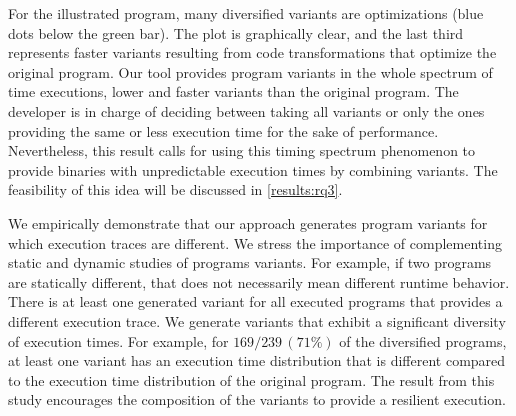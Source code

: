 For the illustrated program, many diversified variants are optimizations (blue dots below the green bar). The plot is graphically clear, and the last third represents faster variants resulting from code transformations that optimize the original program.
Our tool provides program variants in the whole spectrum of time executions, lower and faster variants than the original program. The developer is in charge of deciding between taking all variants or only the ones providing the same or less execution time for the sake of performance. Nevertheless, this result calls for using this timing spectrum phenomenon to provide binaries with unpredictable execution times by combining variants. The feasibility of this idea will be discussed in \autoref{results:rq3}.


\begin{tcolorbox}[title=Answer to RQ2.,boxrule=2pt,arc=.3em,boxsep=1.5mm]
    We empirically demonstrate that our approach generates program variants for which execution traces are different. We stress the importance of complementing static and dynamic studies of programs variants. For example, if two programs are statically different, that does not necessarily mean different runtime behavior. There is at least one generated variant for all executed programs that provides a different execution trace. 
    We generate variants that exhibit a significant diversity of execution times. For example, for $169/239\,(71\%)$ of the diversified programs, at least one variant has an execution time distribution that is different compared to the execution time distribution of the original program. 
    The result from this study encourages the composition of the variants to provide a resilient execution.
\end{tcolorbox}